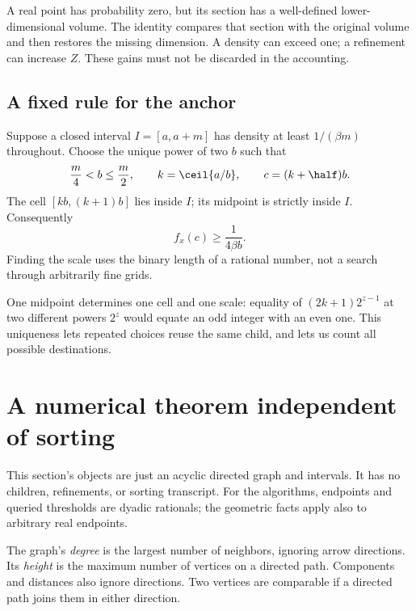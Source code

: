 A real point has probability zero, but its section has a well-defined lower-dimensional volume. The identity compares that section with the original volume and then restores the missing dimension. A density can exceed one; a refinement can increase \(Z\). These gains must not be discarded in the accounting.

\subsection{A fixed rule for the anchor}\label{sec:grid}

Suppose a closed interval \(I=[a,a+m]\) has density at least \(1/(\beta m)\) throughout. Choose the unique power of two \(b\) such that
\[
\frac m4<b\le\frac m2,
\qquad k=\ceil{a/b},
\qquad c=(k+\half)b.
\]
The cell \([kb,(k+1)b]\) lies inside \(I\); its midpoint is strictly inside \(I\). Consequently
\begin{equation}\label{eq:round-density}
f_x(c)\ge\frac1{4\beta b}.
\end{equation}
Finding the scale uses the binary length of a rational number, not a search through arbitrarily fine grids.

One midpoint determines one cell and one scale: equality of \((2k+1)2^{z-1}\) at two different powers \(2^z\) would equate an odd integer with an even one. This uniqueness lets repeated choices reuse the same child, and lets us count all possible destinations.

\section{A numerical theorem independent of sorting}\label{sec:oracle}

This section's objects are just an acyclic directed graph and intervals. It has no children, refinements, or sorting transcript. For the algorithms, endpoints and queried thresholds are dyadic rationals; the geometric facts apply also to arbitrary real endpoints.

The graph's \emph{degree} is the largest number of neighbors, ignoring arrow directions. Its \emph{height} is the maximum number of vertices on a directed path. Components and distances also ignore directions. Two vertices are comparable if a directed path joins them in either direction.

